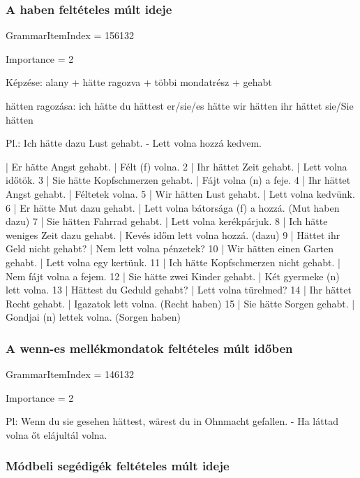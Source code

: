 \documentclass{article}
\newenvironment{desc}{\verbatim}{\endverbatim}
\newenvironment{exmp}{\verbatim}{\endverbatim}
\begin{document}
\subsubsection{A haben feltételes múlt ideje}

GrammarItemIndex = 156132

Importance = 2

\begin{desc}
Képzése:
alany + hätte ragozva + többi mondatrész + gehabt

hätten ragozása:
ich hätte
du hättest
er/sie/es hätte
wir hätten
ihr hättet
sie/Sie hätten

Pl.: Ich hätte dazu Lust gehabt. - Lett volna hozzá kedvem.
\end{desc}

\begin{exmp}
1 | Er hätte Angst gehabt. | Félt (f) volna.
2 | Ihr hättet Zeit gehabt. | Lett volna időtök.
3 | Sie hätte Kopfschmerzen gehabt. | Fájt volna (n) a feje.
4 | Ihr hättet Angst gehabt. | Féltetek volna.
5 | Wir hätten Lust gehabt. | Lett volna kedvünk.
6 | Er hätte Mut dazu gehabt. | Lett volna bátorsága (f) a hozzá. (Mut haben dazu)
7 | Sie hätten Fahrrad gehabt. | Lett volna kerékpárjuk.
8 | Ich hätte weniges Zeit dazu gehabt. | Kevés időm lett volna hozzá. (dazu)
9 | Hättet ihr Geld nicht gehabt? | Nem lett volna pénzetek?
10 | Wir hätten einen Garten gehabt. | Lett volna egy kertünk.
11 | Ich hätte Kopfschmerzen nicht gehabt. | Nem fájt volna a fejem.
12 | Sie hätte zwei Kinder gehabt. | Két gyermeke (n) lett volna.
13 | Hättest du Geduld gehabt? | Lett volna türelmed?
14 | Ihr hättet Recht gehabt. | Igazatok lett volna. (Recht haben)
15 | Sie hätte Sorgen gehabt. | Gondjai (n) lettek volna. (Sorgen haben)
\end{exmp}

\subsubsection{A wenn-es mellékmondatok feltételes múlt időben}

GrammarItemIndex = 146132

Importance = 2

\begin{desc}
Pl: Wenn du sie gesehen hättest, wärest du in Ohnmacht gefallen. - Ha láttad volna őt elájultál volna.
\end{desc}

\subsubsection{Módbeli segédigék feltételes múlt ideje}
\end{document}
